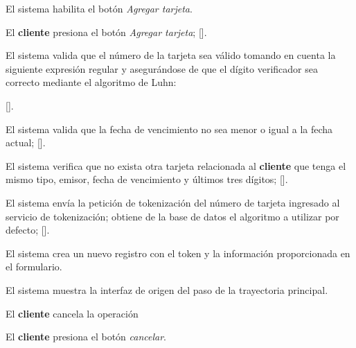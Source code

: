 {\begin{trayectoriaPrincipal}
    \item El sistema habilita el botón \textit{Agregar tarjeta}.

    \item El \textbf{cliente} presiona el botón \textit{Agregar tarjeta};
      [].

    \item El sistema valida que el número de la tarjeta sea válido tomando en
      cuenta la siguiente expresión regular y asegurándose de que el dígito
      verificador sea correcto mediante el algoritmo de Luhn:


      [].

    \item El sistema valida que la fecha de vencimiento no sea menor o igual a
      la fecha actual; [].

    \item El sistema verifica que no exista otra tarjeta relacionada al
      \textbf{cliente} que tenga el mismo tipo, emisor, fecha de vencimiento
      y últimos tres dígitos; [].

    \item El sistema envía la petición de tokenización del número de tarjeta
      ingresado al servicio de tokenización; obtiene de la base de datos el
      algoritmo a utilizar por defecto;
      [].

    \item El sistema crea un nuevo registro con el token y la información
      proporcionada en el formulario.

    \item El sistema muestra la interfaz de origen del paso
       de la trayectoria principal.

  \end{trayectoriaPrincipal}


  \begin{trayectoriaAlternativa}
    {El \textbf{cliente} cancela la operación}

    \item El \textbf{cliente} presiona el botón \textit{cancelar}.


\end{trayectoriaAlternativa}}
